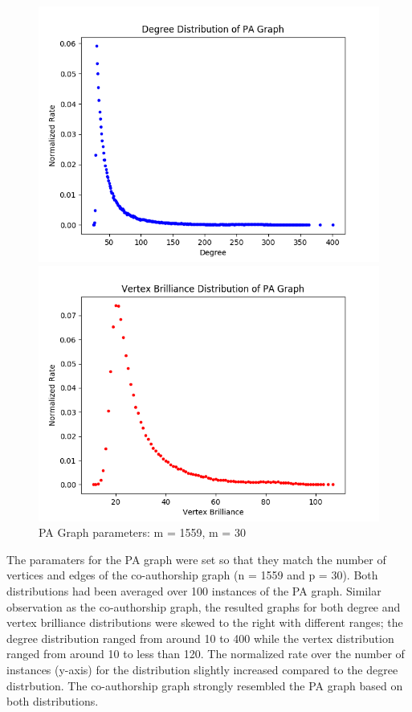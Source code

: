 \documentclass[11pt,a4paper,notitlepage]{article}
\begin{document}
\begin{figure}[H]
    \centering
    \begin{minipage}{0.49\textwidth}
        \centering
        \includegraphics[width=1\textwidth]{pa_graph-1559-30-degree.png}
    \end{minipage}
    \begin{minipage}{0.49\textwidth}
        \centering
        \includegraphics[width=1\textwidth]{pa_graph-1559-30-brilliance.png}
    \end{minipage} \hfill
    \caption{PA Graph parameters: m = 1559, m = 30}
\end{figure}
The paramaters for the PA graph were set so that they match the number of vertices and edges of the co-authorship graph (n = 1559 and p = 30). Both distributions had been averaged over 100 instances of the PA graph. Similar observation as the co-authorship graph, the resulted graphs for both degree and vertex brilliance distributions were skewed to the right with different ranges; the degree distribution ranged from around 10 to 400 while the vertex distribution ranged from around 10 to less than 120. The normalized rate over the number of instances (y-axis) for the distribution slightly increased compared to the degree distrbution. The co-authorship graph strongly resembled the PA graph based on both distributions.
\end{document}
